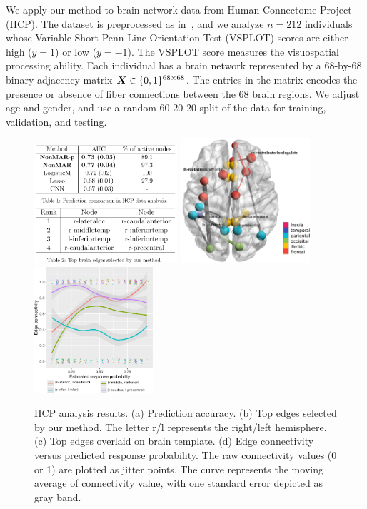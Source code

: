 \documentclass[11pt]{article}
\theoremstyle{definition}
\begin{document}
We apply our method to brain network data from Human Connectome Project (HCP). The dataset is preprocessed as in~\cite{wang2017common}, and we analyze $n=212$ individuals whose Variable Short Penn Line Orientation Test (VSPLOT) scores are either high ($y=1$) or low ($y=-1$). The VSPLOT score measures the visuospatial processing ability. Each individual has a brain network represented by a 68-by-68 binary adjacency matrix $\bm X\in\{0,1\}^{68\times 68}$. The entries in the matrix encodes the presence or absence of fiber connections between the 68 brain regions. We adjust age and gender, and use a random 60-20-20 split of the data for training, validation, and testing. 

\begin{figure}[ht]
    \centering
       \includegraphics[width=5.3cm]{compare}\hspace{.8cm}
   \includegraphics[width=4.8cm]{brain.pdf}\hspace{.8cm}
          \includegraphics[width=4.4cm]{traj2.pdf}
 \caption{HCP analysis results. (a) Prediction accuracy. (b) Top edges selected by our method. The letter r/l represents the right/left hemisphere. (c) Top edges overlaid on brain template. (d) Edge connectivity versus predicted response probability. The raw connectivity values (0 or 1) are plotted as jitter points. The curve represents the moving average of connectivity value, with one standard error depicted as gray band. }\label{fig:real}
 \vspace{-.5cm}
\end{figure}
\end{document}
